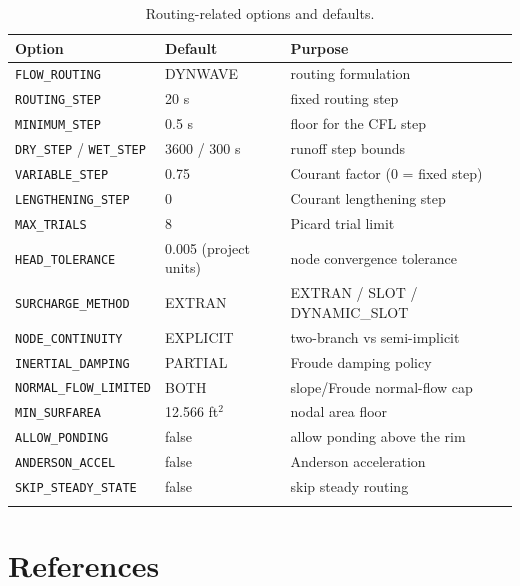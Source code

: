 \documentclass[11pt,a4paper]{article}
\begin{document}
\begin{longtable}{lll}
\toprule
\textbf{Option} & \textbf{Default} & \textbf{Purpose} \\
\midrule
\endhead
\texttt{FLOW\_ROUTING} & DYNWAVE & routing formulation \\
\texttt{ROUTING\_STEP} & 20 s & fixed routing step \\
\texttt{MINIMUM\_STEP} & 0.5 s & floor for the CFL step \\
\texttt{DRY\_STEP} / \texttt{WET\_STEP} & 3600 / 300 s & runoff step bounds \\
\texttt{VARIABLE\_STEP} & 0.75 & Courant factor (0 = fixed step) \\
\texttt{LENGTHENING\_STEP} & 0 & Courant lengthening step \\
\texttt{MAX\_TRIALS} & 8 & Picard trial limit \\
\texttt{HEAD\_TOLERANCE} & 0.005 (project units) & node convergence tolerance \\
\texttt{SURCHARGE\_METHOD} & EXTRAN & EXTRAN / SLOT / DYNAMIC\_SLOT \\
\texttt{NODE\_CONTINUITY} & EXPLICIT & two-branch vs semi-implicit \\
\texttt{INERTIAL\_DAMPING} & PARTIAL & Froude damping policy \\
\texttt{NORMAL\_FLOW\_LIMITED} & BOTH & slope/Froude normal-flow cap \\
\texttt{MIN\_SURFAREA} & 12.566 ft$^2$ & nodal area floor \\
\texttt{ALLOW\_PONDING} & false & allow ponding above the rim \\
\texttt{ANDERSON\_ACCEL} & false & Anderson acceleration \\
\texttt{SKIP\_STEADY\_STATE} & false & skip steady routing \\
\bottomrule
\caption{Routing-related options and defaults.}
\label{tab:options}
\end{longtable}

\section{References}
\end{document}
